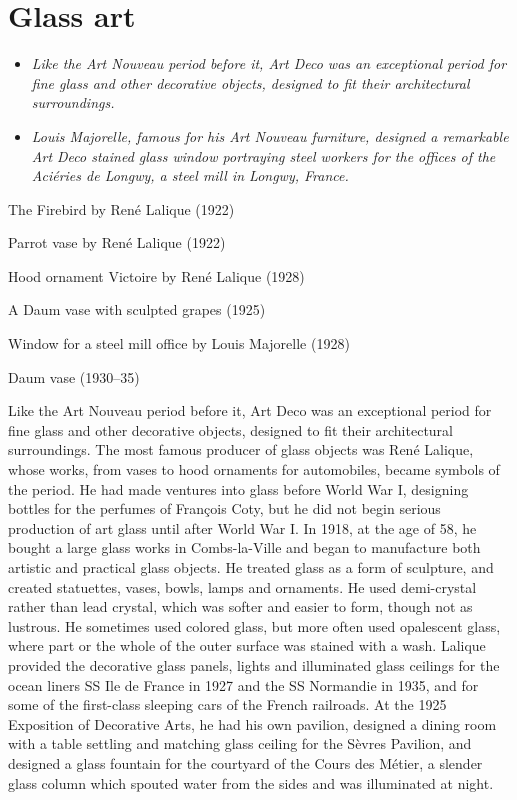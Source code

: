 \section{Glass art}\label{glass-art}

\begin{itemize}
\item
  \emph{Like the Art Nouveau period before it, Art Deco was an
  exceptional period for fine glass and other decorative objects,
  designed to fit their architectural surroundings.}
\item
  \emph{Louis Majorelle, famous for his Art Nouveau furniture, designed
  a remarkable Art Deco stained glass window portraying steel workers
  for the offices of the Aciéries de Longwy, a steel mill in Longwy,
  France.}
\end{itemize}

The Firebird by René Lalique (1922)

Parrot vase by René Lalique (1922)

Hood ornament Victoire by René Lalique (1928)

A Daum vase with sculpted grapes (1925)

Window for a steel mill office by Louis Majorelle (1928)

Daum vase (1930--35)

Like the Art Nouveau period before it, Art Deco was an exceptional
period for fine glass and other decorative objects, designed to fit
their architectural surroundings. The most famous producer of glass
objects was René Lalique, whose works, from vases to hood ornaments for
automobiles, became symbols of the period. He had made ventures into
glass before World War I, designing bottles for the perfumes of François
Coty, but he did not begin serious production of art glass until after
World War I. In 1918, at the age of 58, he bought a large glass works in
Combs-la-Ville and began to manufacture both artistic and practical
glass objects. He treated glass as a form of sculpture, and created
statuettes, vases, bowls, lamps and ornaments. He used demi-crystal
rather than lead crystal, which was softer and easier to form, though
not as lustrous. He sometimes used colored glass, but more often used
opalescent glass, where part or the whole of the outer surface was
stained with a wash. Lalique provided the decorative glass panels,
lights and illuminated glass ceilings for the ocean liners SS Ile de
France in 1927 and the SS Normandie in 1935, and for some of the
first-class sleeping cars of the French railroads. At the 1925
Exposition of Decorative Arts, he had his own pavilion, designed a
dining room with a table settling and matching glass ceiling for the
Sèvres Pavilion, and designed a glass fountain for the courtyard of the
Cours des Métier, a slender glass column which spouted water from the
sides and was illuminated at night.

